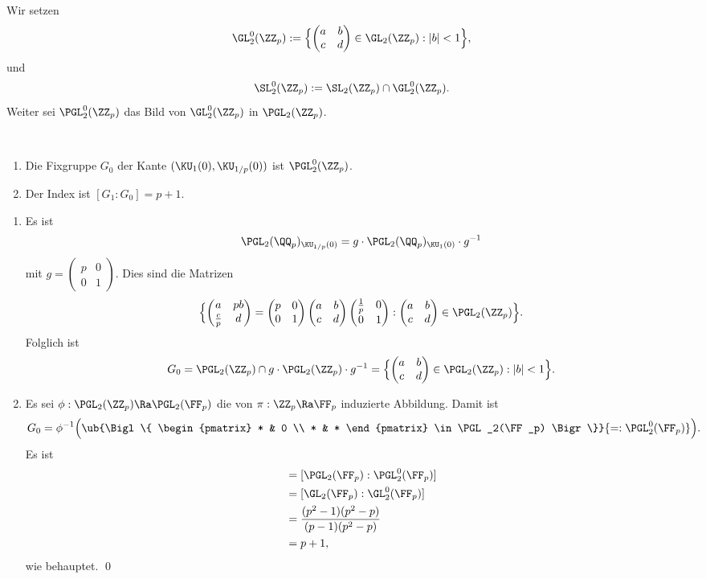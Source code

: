 \DEF Wir setzen
\[
\GL_2^0(\ZZ_p) :=
\Bigl\{
\begin{pmatrix}
a & b \\
c & d
\end{pmatrix}\in\GL_2(\ZZ_p) : |b|<1
\Bigr\},
\]
und 
\[
\SL_2^0(\ZZ_p):=\SL_2(\ZZ_p)\cap\GL_2^0(\ZZ_p).
\]
Weiter sei $\PGL_2^0(\ZZ_p)$ das Bild von $\GL_2^0(\ZZ_p)$
in $\PGL_2(\ZZ_p)$.

\FOLG\ \begin{enumerate}
\item Die Fixgruppe $G_0$ der Kante $(\KU_1(0),\KU_{1/p}(0))$
ist $\PGL_2^0(\ZZ_p)$.
\item Der Index ist $[G_1:G_0]=p+1$.
\end{enumerate}
\bew \begin{enumerate}
\item Es ist
\[
\PGL_2(\QQ_p)_{\KU_{1/p}(0)}
=g\cdot\PGL_2(\QQ_p)_{\KU_1(0)}\cdot g^{-1}
\]
mit $g=\begin{pmatrix}
p & 0 \\
0 & 1
\end{pmatrix}$.
Dies sind die Matrizen
\[
\Bigl\{
\begin{pmatrix}
a & pb \\
\frac{c}{p} & d
\end{pmatrix}
=
\begin{pmatrix}
p & 0 \\
0 & 1
\end{pmatrix}
\begin{pmatrix}
a & b \\
c & d
\end{pmatrix}
\begin{pmatrix}
\frac{1}{p} & 0 \\
0 & 1
\end{pmatrix}
:
\begin{pmatrix}
a & b \\
c & d
\end{pmatrix}\in\PGL_2(\ZZ_p)
\Bigr\}.
\]
Folglich ist
\[
G_0 = \PGL_2(\ZZ_p) \cap g\cdot\PGL_2(\ZZ_p)\cdot g^{-1}
=
\Bigl\{
\begin{pmatrix}
a & b \\
c & d
\end{pmatrix}\in\PGL_2(\ZZ_p):|b|<1
\Bigr\}.
\]
\item Es sei $\phi:\PGL_2(\ZZ_p)\Ra\PGL_2(\FF_p)$ die von
$\pi:\ZZ_p\Ra\FF_p$ induzierte Abbildung. Damit ist
\[
G_0=\phi^{-1}\Bigl(
\ub{\Bigl\{
\begin{pmatrix}
* & 0 \\
* & *
\end{pmatrix}
\in\PGL_2(\FF_p)
\Bigr\}}{=:\PGL_2^0(\FF_p)}
\Bigr).
\]
Es ist
\begin{align*}
[G_1:G_0] &= [\PGL_2(\FF_p):\PGL_2^0(\FF_p)] \\
&= [\GL_2(\FF_p):\GL_2^0(\FF_p)] \\
&=\frac{(p^2-1)(p^2-p)}{(p-1)(p^2-p)} \\
&=p+1,
\end{align*}
wie behauptet.
\qed
\end{enumerate}

